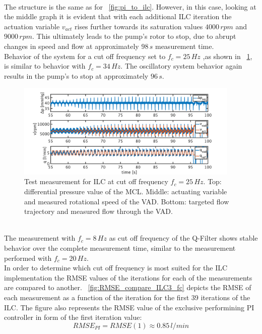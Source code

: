 \\The structure is the same as for \figurename~\ref{fig:pi_to_ilc}. However, in this case, looking at the middle graph it is evident that with each additional ILC iteration the actuation variable $v_{act}$ rises further towards its saturation values $4000\,rpm$ and $9000\,rpm$. This ultimately leads to the pump's rotor to stop, due to abrupt changes in speed and flow at approximately $98\,s$ measurement time.
\\Behavior of the system for a cut off frequency set to $f_c=25\,Hz$ ,as shown in \figurename~\ref{fig:pi_to_ilc_fc_25}, is similar to behavior with $f_c=34\,Hz$. The oscillatory system behavior again results in the pump's to stop at approximately $96\,s$.
\begin{figure}[ht]
  \centering
  \includegraphics[width=0.95\textwidth]{images/chapt_5/ILC/pi_to_ilc_fc_25.pdf}
  \caption[Test measurement for ILC at cut off frequency $f_c=25\,Hz$]{Test measurement for ILC at cut off frequency $f_c=25\,Hz$. Top: differential pressure value of the MCL. Middle: actuating variable and measured rotational speed of the VAD. Bottom: targeted flow trajectory and measured flow through the VAD.}
  \label{fig:pi_to_ilc_fc_25}
\end{figure}
\\The measurement with $f_c=8\,Hz$ as cut off frequency of the Q-Filter shows stable behavior over the complete measurement time, similar to the measurement performed with $f_c=20\,Hz$.
\\In order to determine which cut off frequency is most suited for the ILC implementation the RMSE values of the iterations for each of the measurements are compared to another. \figurename~\ref{fig:RMSE_compare_ILC3_fc} depicts the RMSE of each measurement as a function of the iteration for the first 39 iterations of the ILC. The figure also represents the RMSE value of the exclusive performining PI controller in form of the first iteration value:
\begin{equation}
  RMSE_{PI}=RMSE(1)\approx 0.85\,l/min
\end{equation}
